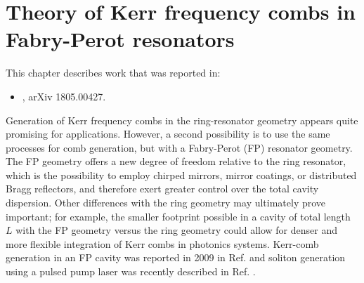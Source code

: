  \chapter{Theory of Kerr frequency combs in Fabry-Perot resonators} \label{chap:FPLLE}
 
 \begin{footnotesize}
 \begin{spacing}{1.2}
 	This chapter describes work that was reported in:
 	\begin{itemize}
 		\item {}, arXiv 1805.00427.\\
 	\end{itemize}
 \end{spacing}
\end{footnotesize}

Generation of Kerr frequency combs in the ring-resonator geometry appears quite promising for applications. However, a second possibility is to use the same processes for comb generation, but with a Fabry-Perot (FP) resonator geometry. The FP geometry offers a new degree of freedom relative to the ring resonator, which is the possibility to employ chirped mirrors, mirror coatings, or distributed Bragg reflectors, and therefore exert greater control over the total cavity dispersion. Other differences with the ring geometry may ultimately prove important; for example, the smaller footprint possible in a cavity of total length $L$ with the FP geometry versus the ring geometry could allow for denser and more flexible integration of Kerr combs in photonics systems. Kerr-comb generation in an FP cavity was reported in 2009 in Ref.  and soliton generation using a pulsed pump laser was recently described in Ref. .

